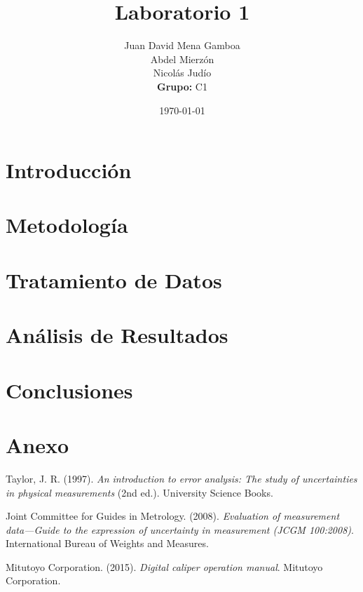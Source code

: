 \documentclass[11pt,twocolumn]{article}
\title{\textbf{Laboratorio 1}}
\author{%
  Juan David Mena Gamboa\\
  Abdel Mierzón                   \\
  Nicolás Judío                    \\
  \textbf{Grupo:} C1
}
\date{\today}
\begin{document}
\maketitle
\thispagestyle{fancy}

\section{Introducción}

\section{Metodología}

\section{Tratamiento de Datos}

\section{Análisis de Resultados}

\section{Conclusiones}

\section{Anexo}

\begin{thebibliography}{9}

 Taylor, J. R. (1997). \textit{An introduction to error analysis: The study of uncertainties in physical measurements} (2nd ed.). University Science Books.

 Joint Committee for Guides in Metrology. (2008). \textit{Evaluation of measurement data—Guide to the expression of uncertainty in measurement (JCGM 100:2008)}. International Bureau of Weights and Measures.

 Mitutoyo Corporation. (2015). \textit{Digital caliper operation manual}. Mitutoyo Corporation.

\end{thebibliography}
\end{document}
